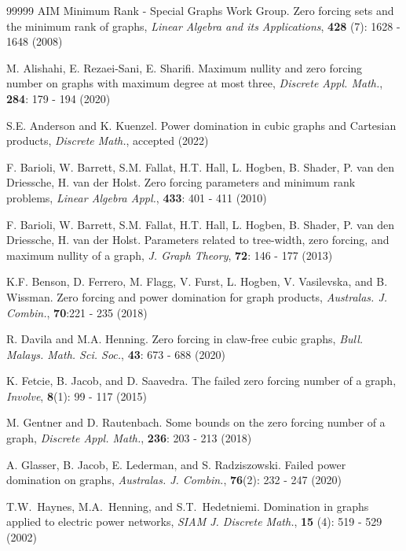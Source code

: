\documentclass[11pt]{article}
\begin{document}
\begin{thebibliography}{99999}
 AIM Minimum Rank - Special Graphs Work Group. Zero forcing sets and the minimum rank of graphs, \textit{Linear Algebra and its Applications}, \textbf{428} (7): 1628 - 1648 (2008)

 M. Alishahi, E. Rezaei-Sani, E. Sharifi. Maximum nullity and zero forcing number on graphs with maximum degree at most three, \textit{Discrete Appl. Math.}, \textbf{284}: 179 - 194 (2020)

 S.E. Anderson and K. Kuenzel. Power domination in cubic graphs and Cartesian products, \textit{Discrete Math.}, accepted (2022)

 F. Barioli, W. Barrett, S.M. Fallat, H.T. Hall, L. Hogben, B. Shader, P. van den Driessche, H. van der Holst. Zero forcing parameters and minimum rank problems, \textit{Linear Algebra Appl.}, \textbf{433}: 401 - 411 (2010)

 F. Barioli, W. Barrett, S.M. Fallat, H.T. Hall, L. Hogben, B. Shader, P. van den Driessche, H. van der Holst. Parameters related to tree-width, zero forcing, and maximum nullity of a graph, \textit{J. Graph Theory}, \textbf{72}: 146 - 177 (2013)



 K.F. Benson, D. Ferrero, M. Flagg, V. Furst, L. Hogben, V. Vasilevska, and B. Wissman. Zero forcing and power domination for graph products, \textit{Australas. J. Combin.}, \textbf{70}:221 - 235 (2018)

 R. Davila and M.A. Henning. Zero forcing in claw-free cubic graphs, \textit{Bull. Malays. Math. Sci. Soc.}, \textbf{43}: 673 - 688 (2020)

 K. Fetcie, B. Jacob, and D. Saavedra. The failed zero forcing number of a graph, \textit{Involve}, \textbf{8}(1): 99 - 117 (2015)

 M. Gentner and D. Rautenbach. Some bounds on the zero forcing number of a graph, \textit{Discrete Appl. Math.}, \textbf{236}: 203 - 213 (2018)

 A. Glasser, B. Jacob, E. Lederman, and S. Radziszowski. Failed power domination on graphs, \textit{Australas. J. Combin.}, 
\textbf{76}(2): 232 - 247 (2020)

 T.W.~Haynes, M.A.~Henning, and S.T.~Hedetniemi. Domination in graphs applied to electric power networks,  \textit{SIAM J. Discrete Math.}, \textbf{15} (4): 519 - 529 (2002)


\end{thebibliography}
\end{document}
